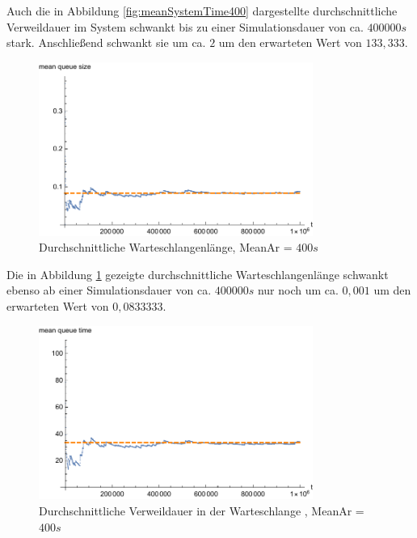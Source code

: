 Auch die in Abbildung \ref{fig:meanSystemTime400} dargestellte durchschnittliche Verweildauer im System schwankt bis zu einer Simulationsdauer von ca. $400000s$ stark. Anschließend schwankt sie um ca. $2$ um den erwarteten Wert von $133,333$.

\begin{figure}[htpb]
	\centering
	\includegraphics[width=0.8\textwidth]{abbildungen/1_Phone/Arrival_400_Serve_100_dur_1000000_Skip_0/MeanQueueSize.pdf}
	\caption{Durchschnittliche Warteschlangenlänge, MeanAr = $400s$}
	\label{fig:meanQueueSize400}
\end{figure}

Die in Abbildung \ref{fig:meanQueueSize400} gezeigte durchschnittliche Warteschlangenlänge schwankt ebenso ab einer Simulationsdauer von ca. $400000s$ nur noch um ca. $0,001$ um den erwarteten Wert von $0,0833333$.

\begin{figure}[htpb]
	\centering
	\includegraphics[width=0.8\textwidth]{abbildungen/1_Phone/Arrival_400_Serve_100_dur_1000000_Skip_0/MeanQueueTime.pdf}
	\caption{Durchschnittliche Verweildauer in der Warteschlange , MeanAr = $400s$}
	\label{fig:meanQueueTime400}
\end{figure}

